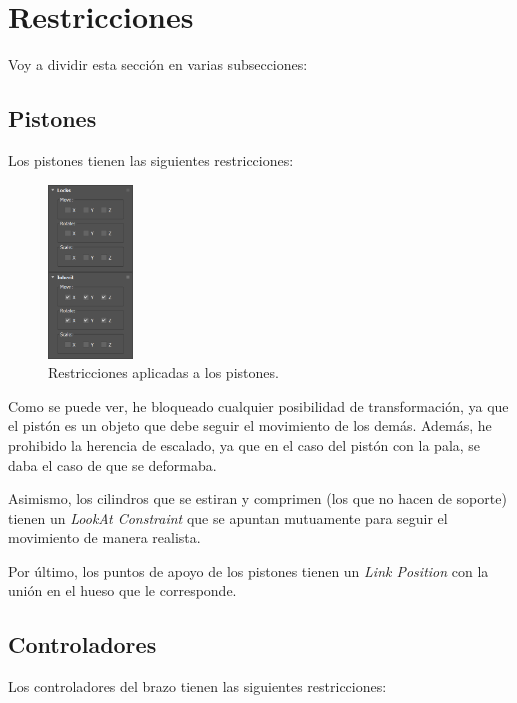 \section{Restricciones}

Voy a dividir esta sección en varias subsecciones:

\subsection{Pistones}

Los pistones tienen las siguientes restricciones:

\begin{figure}[H]
    \centering
    \includegraphics[width=0.2\textwidth]{imagenes/pistonlock.png}
    \caption{Restricciones aplicadas a los pistones.}
 \end{figure}

Como se puede ver, he bloqueado cualquier posibilidad de transformación, ya que el pistón es un objeto que debe seguir el movimiento de los demás. Además, he prohibido la herencia de escalado, ya que en el caso del pistón con la pala, se daba el caso de que se deformaba.

\bigskip

Asimismo, los cilindros que se estiran y comprimen (los que no hacen de soporte) tienen un \textit{LookAt Constraint} que se apuntan mutuamente para seguir el movimiento de manera realista.

\bigskip

Por último, los puntos de apoyo de los pistones tienen un \textit{Link Position} con la unión en el hueso que le corresponde.

\newpage

\subsection{Controladores}

Los controladores del brazo tienen las siguientes restricciones:

